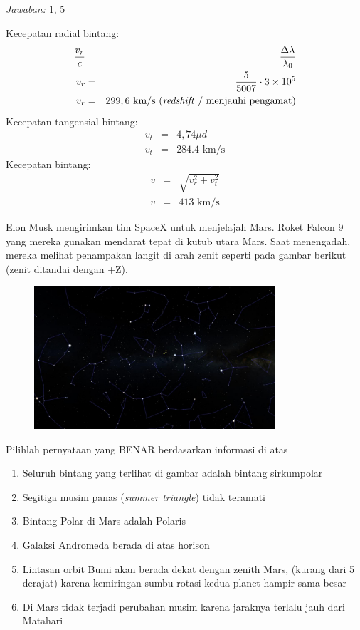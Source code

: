 \documentclass[11pt,fleqn]{exam}
\begin{document}
\begin{questions}
\bigskip
\textit{Jawaban: } 1, 5

Kecepatan radial bintang:
\begin{eqnarray*}
    \frac{v_r}{c} &=& \frac{\Delta \lambda}{\lambda_0}\\
    v_r &=& \frac{5}{5007} \cdot 3 \times 10^{5}\\
    v_r &=& 299,6 \text{  km/s (\textit{redshift} / menjauhi pengamat)}
\end{eqnarray*}
Kecepatan tangensial bintang:
\begin{eqnarray*}
    v_t &=& 4,74 \mu d\\
    v_t &=& 284.4 \text{  km/s}
\end{eqnarray*}
Kecepatan bintang:
\begin{eqnarray*}
    v &=& \sqrt{v_r^2 + v_t^2}\\
    v &=& 413 \text{  km/s}
\end{eqnarray*}

\vspace{0.5cm}
\question Elon Musk mengirimkan tim SpaceX untuk menjelajah Mars. Roket Falcon 9 yang mereka gunakan mendarat tepat di kutub utara Mars. Saat menengadah, mereka melihat penampakan langit di arah zenit seperti pada gambar berikut (zenit ditandai dengan +Z).
\begin{figure}[H]
\centering
\includegraphics[width=0.8\textwidth]{osp2022_23.png}
\label{fig:osp2022_23}
\end{figure}
Pilihlah pernyataan yang BENAR berdasarkan informasi di atas
\begin{enumerate}
    \item Seluruh bintang yang terlihat di gambar adalah bintang sirkumpolar
    \item Segitiga musim panas (\textit{summer triangle}) tidak teramati
    \item Bintang Polar di Mars adalah Polaris
    \item Galaksi Andromeda berada di atas horison
    \item Lintasan orbit Bumi akan berada dekat dengan zenith Mars, (kurang dari 5 derajat) karena kemiringan sumbu rotasi kedua planet hampir sama besar
    \item Di Mars tidak terjadi perubahan musim karena jaraknya terlalu jauh dari Matahari
\end{enumerate}


\end{questions}
\end{document}

